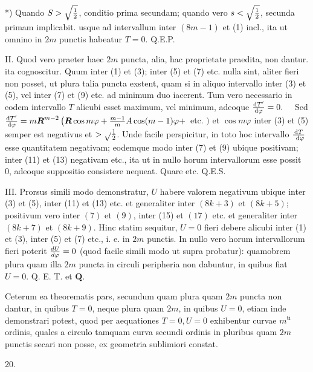\documentclass[twoside,12pt, showframe]{memoir}
\let\oldfrac\frac
\def\frac#1#2{\mathchoice{\tfrac{#1}{#2}}{\oldfrac{#1}{#2}}{\genfrac{}{}{}{2}{#1}{#2\mathstrut}}{\genfrac{}{}{}{3}{#1}{#2\mathstrut}}}
\begin{document}
*) Quando \(S>\sqrt{\frac{1}{2}}\), conditio prima secundam; quando vero \(s<\sqrt{\frac{1}{2}}\), secunda primam implicabit.
usque ad intervallum inter \((8 m-1)\) et (1) incl., ita ut omnino in \(2 m\) punctis habeatur \(T=0\). Q.E.P.

II. Quod vero praeter haec \(2 m\) puncta, alia, hac proprietate praedita, non dantur. ita cognoscitur. Quum inter (1) et (3); inter (5) et (7) etc. nulla sint, aliter fieri non posset, ut plura talia puncta exstent, quam si in aliquo intervallo inter (3) et (5), vel inter (7) et (9) etc. ad minimum duo iacerent. Tum vero necessario in eodem intervallo \(T\) alicubi esset maximum, vel minimum, adeoque \(\frac{\mathrm{d} T^{\prime}}{\mathrm{d} \varphi}=0 . \quad\) Sed \(\frac{\mathrm{d} T^{\prime}}{\mathrm{d} \varphi}=m \boldsymbol{R}^{m-2}\left(\boldsymbol{R} \cos m \varphi+\frac{m-1}{m} A \cos (m-1) \varphi+\right.\) etc. \()\) et \(\cos m \varphi\) inter (3) et (5) semper est negativus et \(>\sqrt{ } \frac{1}{2}\). Unde facile perspicitur, in toto hoc intervallo \(\frac{\mathrm{d} T}{\mathrm{~d} \varphi}\) esse quantitatem negativam; eodemque modo inter (7) et (9) ubique positivam; inter (11) et (13) negativam etc., ita ut in nullo horum intervallorum esse possit 0, adeoque suppositio consistere nequeat. Quare etc. Q.E.S.

III. Prorsus simili modo demonstratur, \(U\) habere valorem negativum ubique inter (3) et (5), inter (11) et (13) etc. et generaliter inter \((8 k+3)\) et \((8 k+5)\); positivum vero inter \((7)\) et \((9)\), inter (15) et \((17)\) etc. et generaliter inter \((8 k+7)\) et \((8 k+9)\). Hinc statim sequitur, \(U=0\) fieri debere alicubi inter (1) et (3), inter (5) et (7) etc., i. e. in \(2 m\) punctis. In nullo vero horum intervallorum fieri poterit \(\frac{d U}{d \varphi}=0\) (quod facile simili modo ut supra probatur): quamobrem plura quam illa \(2 m\) puncta in circuli peripheria non dabuntur, in quibus fiat \(U=0\). Q. E. T. et \(\mathbf{Q}\).

Ceterum ea theorematis pars, secundum quam plura quam \(2 m\) puncta non dantur, in quibus \(T=0\), neque plura quam \(2 m\), in quibus \(U=0\), etiam inde demonstrari potest, quod per aequationes \(T=0, U=0\) exhibentur curvae \(m^{\text {ti }}\) ordinis, quales a circulo tamquam curva secundi ordinis in pluribus quam \(2 m\) punctis secari non posse, ex geometria sublimiori constat.

20.
\end{document}
